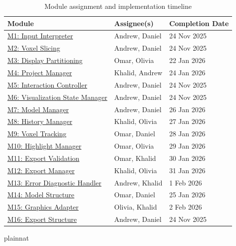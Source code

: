 \documentclass[12pt, titlepage]{article}
\begin{document}
\begin{table}[H]
\centering
\caption{Module assignment and implementation timeline}
\label{tab:module-timeline}
\renewcommand{\arraystretch}{1.2}
\begin{tabular}{|l|l|l|}
\hline
\textbf{Module} & \textbf{Assignee(s)} & \textbf{Completion Date} \\
\hline
\hyperref[m1]{M1: Input Interpreter} & Andrew, Daniel & 24 Nov 2025 \\
\hyperref[m2]{M2: Voxel Slicing} & Andrew, Daniel & 24 Nov 2025 \\
\hyperref[m3]{M3: Display Partitioning} & Omar, Olivia & 22 Jan 2026 \\
\hyperref[m4]{M4: Project Manager} & Khalid, Andrew & 24 Jan 2026 \\
\hyperref[m7]{M5: Interaction Controller} & Andrew, Daniel & 24 Nov 2025 \\
\hyperref[m8]{M6: Visualization State Manager} & Andrew, Daniel & 24 Nov 2025 \\
\hyperref[m9]{M7: Model Manager} & Andrew, Daniel & 26 Jan 2026 \\
\hyperref[m10]{M8: History Manager} & Khalid, Olivia & 27 Jan 2026 \\
\hyperref[m12]{M9: Voxel Tracking} & Omar, Daniel & 28 Jan 2026 \\
\hyperref[m13]{M10: Highlight Manager} & Omar, Olivia & 29 Jan 2026 \\
\hyperref[m14]{M11: Export Validation} & Omar, Khalid & 30 Jan 2026 \\
\hyperref[m15]{M12: Export Manager} & Khalid, Olivia & 31 Jan 2026 \\
\hyperref[m16]{M13: Error Diagnostic Handler} & Andrew, Khalid & 1 Feb 2026 \\
\hyperref[m17]{M14: Model Structure} & Omar, Daniel & 25 Jan 2026 \\
\hyperref[m18]{M15: Graphics Adapter} & Olivia, Khalid & 2 Feb 2026 \\
\hyperref[m20]{M16: Export Structure} & Andrew, Daniel & 24 Nov 2025 \\
\hline
\end{tabular}
\end{table}



 {plainnat}


\newpage{}
\end{document}
